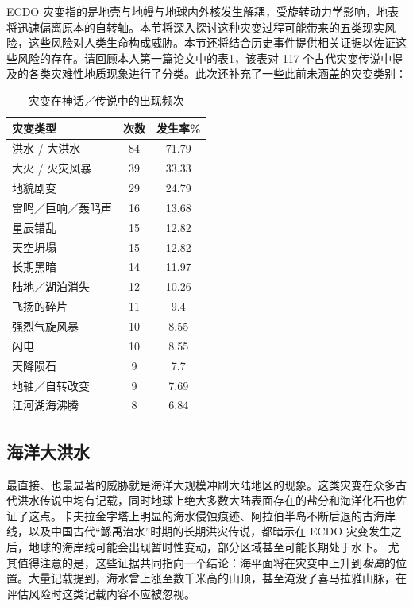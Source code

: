 \documentclass[10pt,twocolumn,letterpaper]{article}
\begin{document}
ECDO 灾变指的是地壳与地幔与地球内外核发生解耦，受旋转动力学影响，地表将迅速偏离原本的自转轴\cite{1}。本节将深入探讨这种灾变过程可能带来的五类现实风险，这些风险对人类生命构成威胁。本节还将结合历史事件提供相关证据以佐证这些风险的存在。请回顾本人第一篇论文中的表\ref{tab: 1}，该表对 117 个古代灾变传说中提及的各类灾难性地质现象进行了分类。此次还补充了一些此前未涵盖的灾变类别：

\begin{table}[ht]
\begin{center}
\renewcommand{\arraystretch}{1.2}  %
\begin{tabular}{|l|c|c|}
\hline
\textbf{灾变类型} & \textbf{次数} & \textbf{发生率\%} \\
\hline\hline
洪水 / 大洪水            & 84 & 71.79 \\
大火 / 火灾风暴          & 39 & 33.33 \\
地貌剧变               & 29 & 24.79 \\
雷鸣／巨响／轰鸣声         & 16 & 13.68 \\
星辰错乱     & 15 & 12.82 \\
天空坍塌           & 15 & 12.82 \\
长期黑暗          & 14 & 11.97 \\
陆地／湖泊消失    & 12 & 10.26 \\
飞扬的碎片           & 11 & 9.4   \\
强烈气旋风暴                  & 10 & 8.55  \\
闪电                  & 10 & 8.55  \\
天降陨石              & 9 & 7.7 \\
地轴／自转改变         & 9 & 7.69  \\
江河湖海沸腾  & 8 & 6.84 \\
\hline
\end{tabular}
\end{center}
\caption{灾变在神话／传说中的出现频次 \cite{12}}
\label{tab: 1}
\end{table}

\subsection{海洋大洪水}

最直接、也最显著的威胁就是海洋大规模冲刷大陆地区的现象\cite{3}。这类灾变在众多古代洪水传说中均有记载，同时地球上绝大多数大陆表面存在的盐分和海洋化石也佐证了这点。卡夫拉金字塔上明显的海水侵蚀痕迹、阿拉伯半岛不断后退的古海岸线\cite{1}，以及中国古代“鲧禹治水”时期的长期洪灾传说，都暗示在 ECDO 灾变发生之后，地球的海岸线可能会出现暂时性变动，部分区域甚至可能长期处于水下。
尤其值得注意的是，这些证据共同指向一个结论：海平面将在灾变中上升到\textit{极高}的位置。大量记载提到，海水曾上涨至数千米高的山顶，甚至淹没了喜马拉雅山脉，在评估风险时这类记载内容不应被忽视。
\end{document}
